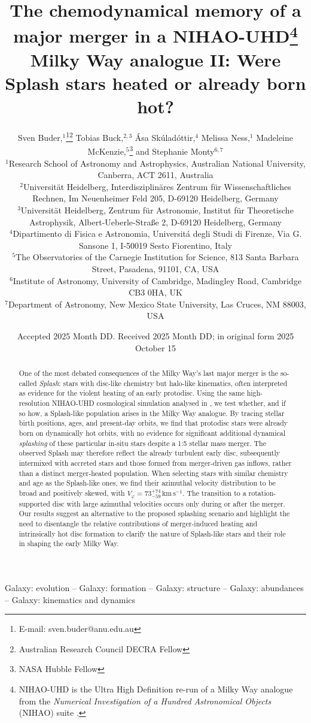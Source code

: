 \documentclass[fleqn,usenatbib]{mnras}
\title[Were Splash stars heated or already born hot?]{The chemodynamical memory of a major merger in a NIHAO-UHD\thanks{NIHAO-UHD is the Ultra High Definition re-run of a Milky Way analogue from the \textit{Numerical Investigation of a Hundred Astronomical Objects} (NIHAO) suite \citep{Wang2015}.} Milky Way analogue II: Were Splash stars heated or already born hot?}
\author[S. Buder et al.]{Sven Buder,$^{1}$\thanks{E-mail: sven.buder@anu.edu.au}\thanks{Australian Research Council DECRA Fellow}\orcidlink{0000-0002-4031-8553}
Tobias Buck,$^{2,3}$\orcidlink{0000-0003-2027-399X}
Ása Skúladóttir,$^{4}$\orcidlink{0000-0001-9155-9018}
Melissa Ness,$^{1}$\orcidlink{0000-0001-5082-6693}
Madeleine McKenzie,$^{5}$\thanks{NASA Hubble Fellow}\orcidlink{0000-0002-1715-1257}
and\newauthor
Stephanie Monty$^{6, 7}$\orcidlink{0000-0002-9225-5822}
\\
$^{1}$Research School of Astronomy and Astrophysics, Australian National University, Canberra, ACT 2611, Australia\\
$^{2}$Universit{\"a}t Heidelberg, Interdisziplin{\"a}res Zentrum f{\"u}r Wissenschaftliches Rechnen, Im Neuenheimer Feld 205, D-69120 Heidelberg, Germany\\
$^{3}$Universit{\"a}t Heidelberg, Zentrum f{\"u}r Astronomie, Institut f{\"u}r Theoretische Astrophysik, Albert-Ueberle-Straße 2, D-69120 Heidelberg, Germany\\
$^{4}$Dipartimento di Fisica e Astronomia, Universitá degli Studi di Firenze, Via G. Sansone 1, I-50019 Sesto Fiorentino, Italy\\
$^{5}$The Observatories of the Carnegie Institution for Science, 813 Santa Barbara Street, Pasadena, 91101, CA, USA\\
$^{6}$Institute of Astronomy, University of Cambridge, Madingley Road, Cambridge CB3 0HA, UK\\
$^{7}$Department of Astronomy, New Mexico State University, Las Cruces, NM 88003, USA
}
\date{Accepted 2025 Month DD. Received 2025 Month DD; in original form 2025 October 15}
\begin{document}
\label{firstpage}
\pagerange{\pageref{firstpage}--\pageref{lastpage}}
\maketitle

\begin{abstract} %
One of the most debated consequences of the Milky Way's last major merger is the so-called \textit{Splash}: stars with disc-like chemistry but halo-like kinematics, often interpreted as evidence for the violent heating of an early protodisc. Using the same high-resolution NIHAO-UHD cosmological simulation analysed in \citet[][]{Buder2025c}, we test whether, and if so how, a Splash-like population arises in the Milky Way analogue. By tracing stellar birth positions, ages, and present-day orbits, we find that protodisc stars were already born on dynamically hot orbits, with no evidence for significant additional dynamical \textit{splashing} of these particular in-situ stars despite a 1:5 stellar mass merger. The observed Splash may therefore reflect the already turbulent early disc, subsequently intermixed with accreted stars and those formed from merger-driven gas inflows, rather than a distinct merger-heated population. When selecting stars with similar chemistry and age as the Splash-like ones, we find their azimuthal velocity distribution to be broad and positively skewed, with $V_\varphi = 73_{-59}^{+74}\,\mathrm{km\,s^{-1}}$. The transition to a rotation-supported disc with large azimuthal velocities occurs only during or after the merger. Our results suggest an alternative to the proposed splashing scenario and highlight the need to disentangle the relative contributions of merger-induced heating and intrinsically hot disc formation to clarify the nature of Splash-like stars and their role in shaping the early Milky Way.
\end{abstract}

\begin{keywords}
Galaxy: evolution -- Galaxy: formation -- Galaxy: structure -- Galaxy: abundances -- Galaxy: kinematics and dynamics
\end{keywords}


\end{document}
